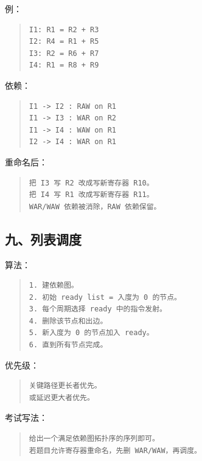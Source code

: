 \documentclass[UTF8,zihao=-4]{ctexart}
\begin{document}
例：


\begin{quote}
\footnotesize
\begin{verbatim}
I1: R1 = R2 + R3
I2: R4 = R1 + R5
I3: R2 = R6 + R7
I4: R1 = R8 + R9
\end{verbatim}
\end{quote}


依赖：


\begin{quote}
\footnotesize
\begin{verbatim}
I1 -> I2 : RAW on R1
I1 -> I3 : WAR on R2
I1 -> I4 : WAW on R1
I2 -> I4 : WAR on R1
\end{verbatim}
\end{quote}


重命名后：


\begin{quote}
\footnotesize
\begin{verbatim}
把 I3 写 R2 改成写新寄存器 R10。
把 I4 写 R1 改成写新寄存器 R11。
WAR/WAW 依赖被消除，RAW 依赖保留。
\end{verbatim}
\end{quote}


\subsection{九、列表调度}


算法：


\begin{quote}
\footnotesize
\begin{verbatim}
1. 建依赖图。
2. 初始 ready list = 入度为 0 的节点。
3. 每个周期选择 ready 中的指令发射。
4. 删除该节点和出边。
5. 新入度为 0 的节点加入 ready。
6. 直到所有节点完成。
\end{verbatim}
\end{quote}


优先级：


\begin{quote}
\footnotesize
\begin{verbatim}
关键路径更长者优先。
或延迟更大者优先。
\end{verbatim}
\end{quote}


考试写法：


\begin{quote}
\footnotesize
\begin{verbatim}
给出一个满足依赖图拓扑序的序列即可。
若题目允许寄存器重命名，先删 WAR/WAW，再调度。
\end{verbatim}
\end{quote}
\end{document}
